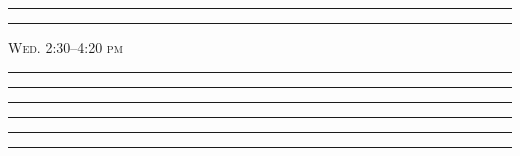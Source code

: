 \documentclass[11pt]{article}
\begin{document}
\begin{multicols}{2}
\rule{2.5in}{0.4pt}\vspace*{0.5cm}

\rule{2.5in}{0.4pt}\vspace*{0.5cm}


\textsc{Wed. 2:30–4:20 pm}\vspace*{0.5cm}

\rule{2.5in}{0.4pt}\vspace*{0.5cm}

\rule{2.5in}{0.4pt}\vspace*{0.5cm}

\rule{2.5in}{0.4pt}\vspace*{0.5cm}

\rule{2.5in}{0.4pt}\vspace*{0.5cm}

\rule{2.5in}{0.4pt}\vspace*{0.5cm}

\rule{2.5in}{0.4pt}\vspace*{0.5cm}

\end{multicols}

\newpage
\end{document}
